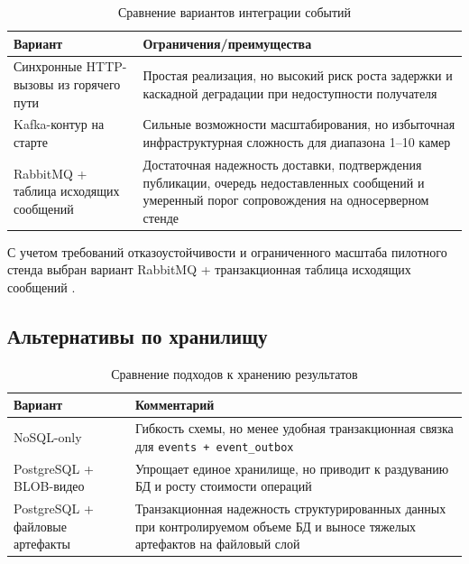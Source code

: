\begin{table}[H]
\caption{Сравнение вариантов интеграции событий}
\label{tab:integration_alternatives}
\begin{tabularx}{\textwidth}{>{\raggedright\arraybackslash}p{}X}
\toprule
Вариант & Ограничения/преимущества \\
\midrule
Синхронные HTTP-вызовы из горячего пути & Простая реализация, но высокий риск роста задержки и каскадной деградации при недоступности получателя \\
Kafka-контур на старте & Сильные возможности масштабирования, но избыточная инфраструктурная сложность для диапазона 1--10 камер \\
RabbitMQ + таблица исходящих сообщений & Достаточная надежность доставки, подтверждения публикации, очередь недоставленных сообщений и умеренный порог сопровождения на односерверном стенде \\
\bottomrule
\end{tabularx}
\end{table}

С учетом требований отказоустойчивости и ограниченного масштаба пилотного стенда выбран вариант RabbitMQ + транзакционная таблица исходящих сообщений \cite{rabbitmq_docs,rabbitmq_confirms,transactional_outbox}.

\subsection{Альтернативы по хранилищу}

\begin{table}[H]
\caption{Сравнение подходов к хранению результатов}
\label{tab:storage_alternatives}
\begin{tabularx}{\textwidth}{>{\raggedright\arraybackslash}p{}X}
\toprule
Вариант & Комментарий \\
\midrule
NoSQL-only & Гибкость схемы, но менее удобная транзакционная связка для \texttt{events + event\_outbox} \\
PostgreSQL + BLOB-видео & Упрощает единое хранилище, но приводит к раздуванию БД и росту стоимости операций \\
PostgreSQL + файловые артефакты & Транзакционная надежность структурированных данных при контролируемом объеме БД и выносе тяжелых артефактов на файловый слой \\
\bottomrule
\end{tabularx}
\end{table}

